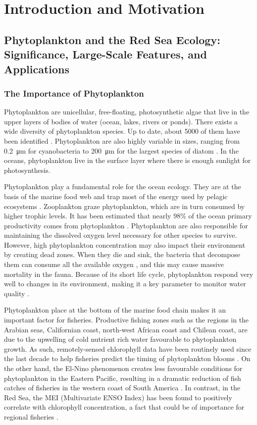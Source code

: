 \chapter{Introduction and Motivation}

\section{Phytoplankton and the Red Sea Ecology: Significance, Large-Scale
Features, and Applications}

\subsection{The Importance of Phytoplankton}

Phytoplankton are unicellular, free-floating, photosynthetic algae that live in
the upper layers of bodies of water (ocean, lakes, rivers or ponds). There
exists a wide diversity of phytoplankton species. Up to date, about 5000 of
them have been identified \citep{Tett1995}. Phytoplankton are also highly
variable in sizes, ranging from \SI{0.2}{\micro\metre} for cyanobacteria to
\SI{200}{\micro\metre} for the largest species of diatom \citep{Pal2014}. In
the oceans, phytoplankton live in the surface layer where there is enough
sunlight for photosynthesis. 

Phytoplankton play a fundamental role for the ocean ecology. They are at the
basis of the marine food web and trap most of the energy used by pelagic
ecosystems \citep{Pal2014}. Zooplankton graze phytoplankton, which are in turn
consumed by higher trophic levels. It has been estimated that nearly 98\% of
the ocean primary productivity comes from phytoplankton \citep{Pal2014}.
Phytoplankton are also responsible for maintaining the dissolved oxygen level
necessary for other species to survive. However, high phytoplankton
concentration may also impact their environment by creating dead zones. When
they die and sink, the bacteria that decompose them can consume all the
available oxygen \citep{Pal2014}, and this may cause massive mortality in the
fauna. Because of its short life cycle, phytoplankton respond very well to
changes in its environment, making it a key parameter to monitor water quality
\citep{Wu2014}.

Phytoplankton place at the bottom of the marine food chain makes it an
important factor for fisheries. Productive fishing zones such as the regions in
the Arabian seas, Californian coast, north-west African coast and Chilean
coast, are due to the upwelling of cold nutrient rich water favourable to
phytoplankton growth. As such, remotely-sensed chlorophyll data have been
routinely used since the last decade to help fisheries predict the timing of
phytoplankton blooms \citep{Robinson2010}. On the other hand, the El-Nino
phenomenon creates less favourable conditions for phytoplankton in the Eastern
Pacific, resulting in a dramatic reduction of fish catches of fisheries in the
western coast of South America \citep{Robinson2010}. In contrast, in the Red
Sea, the MEI (Multivariate ENSO Index) has been found to positively correlate
with chlorophyll concentration, a fact that could be of importance for regional
fisheries \citep{Raitsos2015}.

